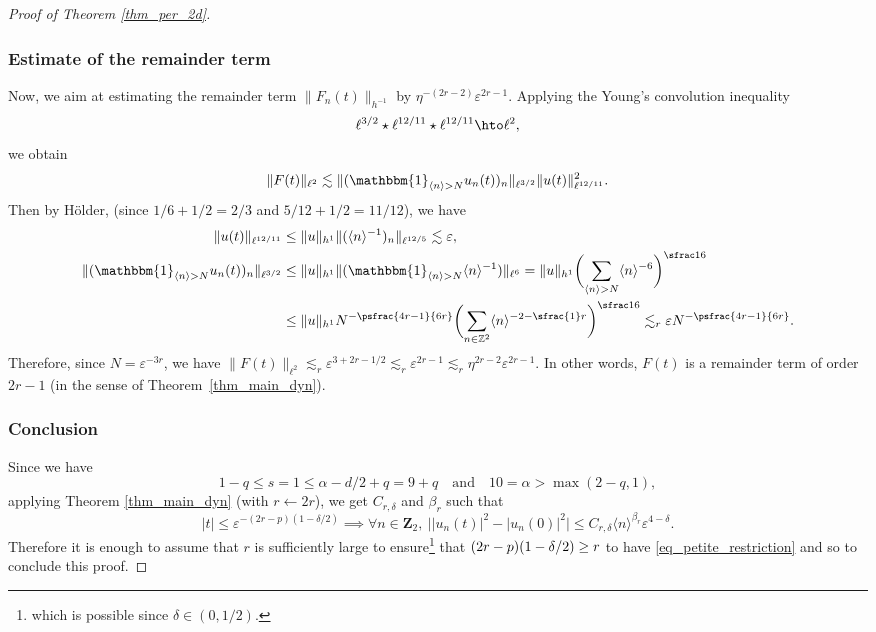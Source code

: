 \begin{proof}[Proof of Theorem \ref{thm_per_2d}]
\subsubsection*{Estimate of the remainder term}
Now, we aim at estimating the remainder term $\|F_n(t)\|_{h^{-1}}$ by $\eta^{-(2r-2)} \varepsilon^{ 2r-1}$. Applying the Young's convolution inequality
\[
\ell^{3/2} \star \ell^{12/11} \star \ell^{12/11} \hto \ell^2,
\]
we obtain
\[
\| F(t)\|_{\ell^2}\lesssim \| (\mathbbm{1}_{\langle n \rangle > N} u_n(t))_n \|_{\ell^{3/2}} \| u(t) \|_{\ell^{12/11}}^2.
\]
Then by Hölder, (since $1/6+1/2=2/3$ and $5/12 + 1/2= 11/12$), we have
\begin{align*}
\| u(t) \|_{\ell^{12/11}} &\leq \|u\|_{h^1} \| (\langle n \rangle^{-1})_n \|_{\ell^{12/5}} \lesssim \varepsilon,
\\
\| (\mathbbm{1}_{\langle n \rangle > N} u_n(t))_n \|_{\ell^{3/2}} &\leq \|u\|_{h^1} \| (\mathbbm{1}_{\langle n \rangle > N} \langle n \rangle^{-1}) \|_{\ell^6} = \|u\|_{h^1} \biggl(\sum_{ \langle n \rangle > N } \langle n \rangle^{-6} \biggr)^{\sfrac16} \\
&\leq \|u\|_{h^1} N^{- \psfrac{4r-1}{6r}} \biggl(\sum_{ n\in \mathbb{Z}^2 } \langle n \rangle^{-2-\sfrac{1}r} \biggr)^{\sfrac16} \lesssim_r \varepsilon N^{- \psfrac{4r-1}{6r}}.
\end{align*}
Therefore, since $N=\varepsilon^{-3r}$, we have $\| F(t)\|_{\ell^2} \lesssim_r \varepsilon^{3+2r - 1/2} \lesssim_r \varepsilon^{ 2r-1} \lesssim_r \eta^{2r-2} \varepsilon^{ 2r-1}$. In other words, $F(t)$ is a remainder term of order $2r-1$ (in the sense of Theorem~\ref{thm_main_dyn}).

\subsubsection*{Conclusion}
Since we have
\[
1 - q\leq s=1 \leq \alpha - d/2 +q =9+q \quad\text{and}\quad 10=\alpha > \max(2-q,1),
\]
applying Theorem \ref{thm_main_dyn} (with $r\leftarrow 2r$), we get $C_{r,\delta}$ and $\beta_r$ such that
\[
|t| \leq \varepsilon^{-(2r-p)(1-\delta/2)} \implies \forall n \in \mathbf{Z}_2, \ \bigl||u_n(t)|^2 - |u_n(0)|^2 \bigr| \leq C_{r,\delta} \langle n \rangle^{\beta_r} \varepsilon^{4-\delta}.
\]
Therefore it is enough to assume that $r$ is sufficiently large to ensure\footnote{which is possible since $\delta \in (0,1/2)$.} that $(2r-\nobreak p)(1-\nobreak\delta/2) \geq r $ to have \eqref{eq_petite_restriction} and so to conclude this proof.
\end{proof}

